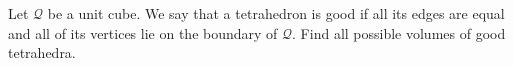 Let $ \mathcal Q$ be a unit cube. We say that a tetrahedron is good if all its edges are equal and all of its vertices lie on the boundary of $ \mathcal Q$. Find all possible volumes of good tetrahedra.